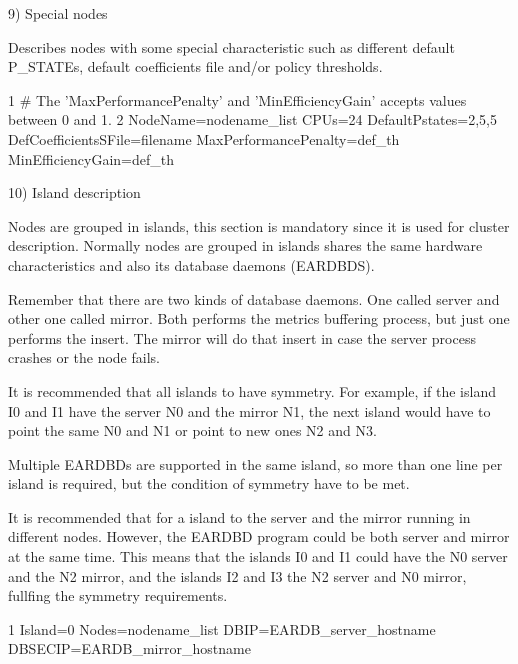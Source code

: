 9) Special nodes

Describes nodes with some special characteristic such as different default P\+\_\+\+S\+T\+A\+T\+Es, default coefficients file and/or policy thresholds.


\begin{DoxyCode}
1 # The 'MaxPerformancePenalty' and 'MinEfficiencyGain' accepts values between 0 and 1.
2 NodeName=nodename\_list CPUs=24 DefaultPstates=2,5,5   DefCoefficientsSFile=filename
       MaxPerformancePenalty=def\_th MinEfficiencyGain=def\_th
\end{DoxyCode}


10) Island description

Nodes are grouped in islands, this section is mandatory since it is used for cluster description. Normally nodes are grouped in islands shares the same hardware characteristics and also its database daemons (E\+A\+R\+D\+B\+DS).

Remember that there are two kinds of database daemons. One called \textquotesingle{}server\textquotesingle{} and other one called \textquotesingle{}mirror\textquotesingle{}. Both performs the metrics buffering process, but just one performs the insert. The mirror will do that insert in case the \textquotesingle{}server\textquotesingle{} process crashes or the node fails.

It is recommended that all islands to have symmetry. For example, if the island I0 and I1 have the server N0 and the mirror N1, the next island would have to point the same N0 and N1 or point to new ones N2 and N3.

Multiple E\+A\+R\+D\+B\+Ds are supported in the same island, so more than one line per island is required, but the condition of symmetry have to be met.

It is recommended that for a island to the server and the mirror running in different nodes. However, the E\+A\+R\+D\+BD program could be both server and mirror at the same time. This means that the islands I0 and I1 could have the N0 server and the N2 mirror, and the islands I2 and I3 the N2 server and N0 mirror, fullfing the symmetry requirements.


\begin{DoxyCode}
1 Island=0 Nodes=nodename\_list DBIP=EARDB\_server\_hostname   DBSECIP=EARDB\_mirror\_hostname
\end{DoxyCode}


